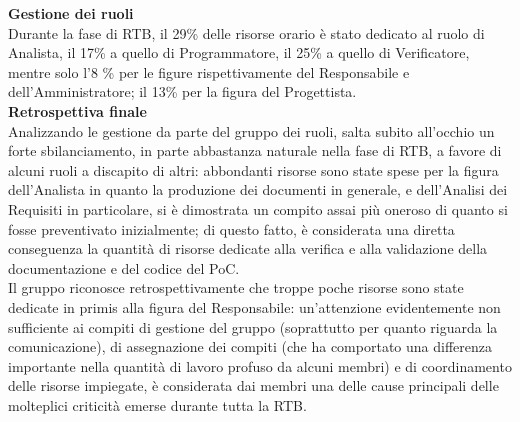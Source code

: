 \textbf{Gestione dei ruoli} \\
Durante la fase di RTB, il 29\% delle risorse orario è stato dedicato al ruolo di Analista, il 17\% a quello di Programmatore, il 25\% a quello di Verificatore, mentre
solo l'8 \% per le figure rispettivamente del Responsabile e dell'Amministratore; il 13\% per la figura del Progettista.\\
\textbf{Retrospettiva finale}\\
Analizzando le gestione da parte del gruppo dei ruoli, salta subito all'occhio un forte sbilanciamento, in parte abbastanza naturale nella fase di RTB, a favore di alcuni ruoli a discapito di altri: abbondanti risorse sono state spese
per la figura dell'Analista in quanto la produzione dei documenti in generale, e dell'Analisi dei Requisiti in particolare, si è dimostrata un compito assai più oneroso di quanto si fosse preventivato
inizialmente; di questo fatto, è considerata una diretta conseguenza la quantità di risorse dedicate alla verifica e alla validazione della documentazione e del codice del PoC. \\
Il gruppo riconosce retrospettivamente che troppe poche risorse sono state dedicate in primis alla figura del Responsabile: un'attenzione evidentemente non sufficiente ai compiti di gestione del gruppo (soprattutto per quanto riguarda la comunicazione), di assegnazione
dei compiti (che ha comportato una differenza importante nella quantità di lavoro profuso da alcuni membri) e
di coordinamento delle risorse impiegate, è considerata dai membri una delle cause principali delle molteplici criticità emerse durante tutta la RTB.
